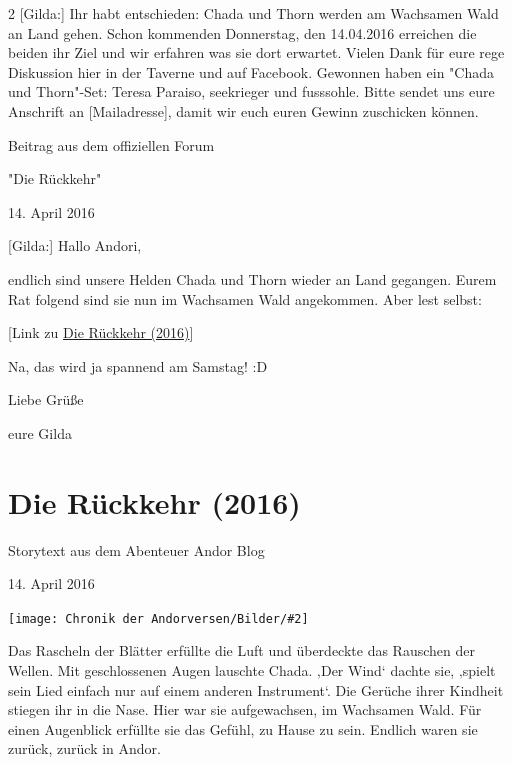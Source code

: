 \documentclass[10pt, a4paper, oneside]{book}
\newcommand{\fillbreak}{\vspace*{\fill}\columnbreak}
\newcommand{\storytext}[1]{%
    \section{#1}%
    \label{Storytext: #1}%
}
\newcommand{\refstorytext}[1]{\hyperref[Storytext: #1]{#1}}
\newcommand{\bildmitts}[2][height=0.32\textwidth,width=0.48\textwidth,keepaspectratio]{%
    \begin{center}
        \texttt{[image: Chronik der Andorversen/Bilder/\#2]}
    \end{center}
}
\begin{document}
\begin{multicols}{2}
[Gilda:] Ihr habt entschieden: Chada und Thorn werden am Wachsamen Wald an Land gehen. Schon kommenden Donnerstag, den 14.04.2016 erreichen die beiden ihr Ziel und wir erfahren was sie dort erwartet. Vielen Dank für eure rege Diskussion hier in der Taverne und auf Facebook. Gewonnen haben ein "Chada und Thorn"-Set: Teresa Paraiso, seekrieger und fusssohle. Bitte sendet uns eure Anschrift an [Mailadresse], damit wir euch euren Gewinn zuschicken können.













\begin{center}
    Beitrag aus dem offiziellen Forum

    "Die Rückkehr"

    14. April 2016
\end{center}

[Gilda:] Hallo Andori,

endlich sind unsere Helden Chada und Thorn wieder an Land gegangen. Eurem Rat folgend sind sie nun im Wachsamen Wald angekommen. Aber lest selbst:

[Link zu \refstorytext{Die Rückkehr (2016)}]

Na, das wird ja spannend am Samstag! :D


Liebe Grüße

eure Gilda




















\fillbreak
\storytext{Die Rückkehr (2016)}


\begin{center}
    Storytext aus dem Abenteuer Andor Blog

    14. April 2016
\end{center}

\bildmitts{AA2016 Blog 8.jpeg}


Das Rascheln der Blätter erfüllte die Luft und überdeckte das Rauschen der Wellen. Mit geschlossenen Augen lauschte Chada. ‚Der Wind‘ dachte sie, ‚spielt sein Lied einfach nur auf einem anderen Instrument‘. Die Gerüche ihrer Kindheit stiegen ihr in die Nase. Hier war sie aufgewachsen, im Wachsamen Wald. Für einen Augenblick erfüllte sie das Gefühl, zu Hause zu sein. Endlich waren sie zurück, zurück in Andor.


\end{multicols}
\end{document}
